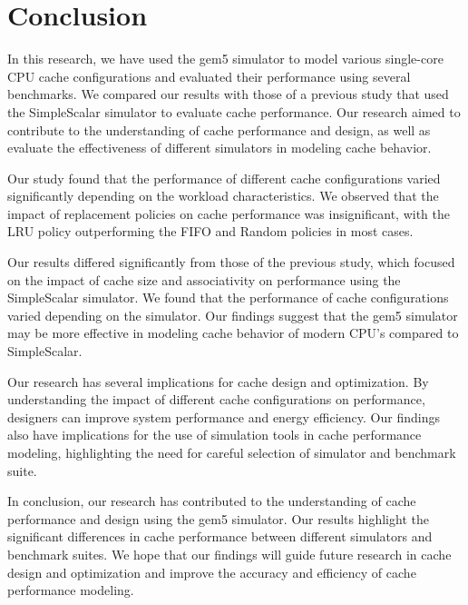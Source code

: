 \documentclass[conference]{IEEEtran}
\begin{document}
\section{Conclusion}
In this research, we have used the gem5 simulator to model various single-core CPU cache configurations and evaluated their performance using several benchmarks. We compared our results with those of a previous study that used the SimpleScalar simulator to evaluate cache performance. Our research aimed to contribute to the understanding of cache performance and design, as well as evaluate the effectiveness of different simulators in modeling cache behavior.

Our study found that the performance of different cache configurations varied significantly depending on the workload characteristics. We observed that the impact of replacement policies on cache performance was insignificant, with the LRU policy outperforming the FIFO and Random policies in most cases.

Our results differed significantly from those of the previous study, which focused on the impact of cache size and associativity on performance using the SimpleScalar simulator. We found that the performance of cache configurations varied depending on the simulator. Our findings suggest that the gem5 simulator may be more effective in modeling cache behavior of modern CPU's compared to SimpleScalar.

Our research has several implications for cache design and optimization. By understanding the impact of different cache configurations on performance, designers can improve system performance and energy efficiency. Our findings also have implications for the use of simulation tools in cache performance modeling, highlighting the need for careful selection of simulator and benchmark suite.

In conclusion, our research has contributed to the understanding of cache performance and design using the gem5 simulator. Our results highlight the significant differences in cache performance between different simulators and benchmark suites. We hope that our findings will guide future research in cache design and optimization and improve the accuracy and efficiency of cache performance modeling.

\printbibliography
\onecolumn

\appendix
\setcounter{section}{0}
\end{document}
